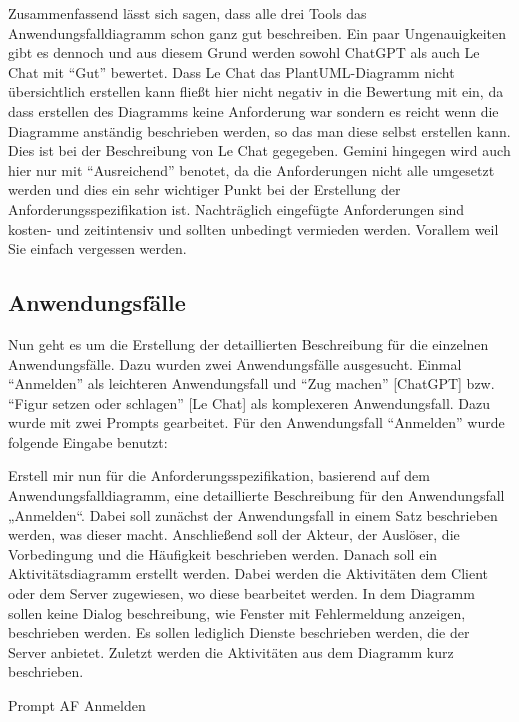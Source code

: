 Zusammenfassend lässt sich sagen, dass alle drei Tools das Anwendungsfalldiagramm schon ganz gut beschreiben. Ein paar Ungenauigkeiten gibt es dennoch und aus 
diesem Grund werden sowohl ChatGPT als auch Le Chat mit ``Gut'' bewertet. Dass Le Chat das PlantUML-Diagramm nicht übersichtlich erstellen kann fließt hier nicht
negativ in die Bewertung mit ein, da dass erstellen des Diagramms keine Anforderung war sondern es reicht wenn die Diagramme anständig beschrieben werden, so das man 
diese selbst erstellen kann. Dies ist bei der Beschreibung von Le Chat gegegeben. Gemini hingegen wird auch hier nur mit ``Ausreichend'' benotet, da die Anforderungen 
nicht alle umgesetzt werden und dies ein sehr wichtiger Punkt bei der Erstellung der Anforderungsspezifikation ist. Nachträglich eingefügte Anforderungen sind kosten- 
und zeitintensiv und sollten unbedingt vermieden werden. Vorallem weil Sie einfach vergessen werden. 

\subsection*{Anwendungsfälle}

Nun geht es um die Erstellung der detaillierten Beschreibung für die einzelnen Anwendungsfälle. Dazu wurden zwei Anwendungsfälle ausgesucht.
Einmal ``Anmelden'' als leichteren Anwendungsfall und ``Zug machen'' [ChatGPT] bzw. ``Figur setzen oder schlagen'' [Le Chat] 
als komplexeren Anwendungsfall. Dazu wurde mit zwei Prompts gearbeitet. Für den Anwendungsfall ``Anmelden'' wurde folgende Eingabe benutzt:

\begin{prompt}[H]
    \begin{tcolorbox}[colback=gray!20, colframe=gray!20, boxrule=0pt, sharp corners] 
        Erstell mir nun für die Anforderungsspezifikation, basierend auf dem Anwendungsfalldiagramm, eine detaillierte Beschreibung für den Anwendungsfall „Anmelden“. Dabei 
        soll zunächst der Anwendungsfall in einem Satz beschrieben werden, was dieser macht. Anschließend soll der Akteur, der Auslöser, die Vorbedingung und die Häufigkeit 
        beschrieben werden. Danach soll ein Aktivitätsdiagramm erstellt werden. Dabei werden die Aktivitäten dem Client oder dem Server zugewiesen, wo diese bearbeitet werden. 
        In dem Diagramm sollen keine Dialog beschreibung, wie Fenster mit Fehlermeldung anzeigen, beschrieben werden. Es sollen lediglich Dienste beschrieben werden, die der 
        Server anbietet. Zuletzt werden die Aktivitäten aus dem Diagramm kurz beschrieben.
        \vfill
    \end{tcolorbox}
    \caption{Prompt AF Anmelden}
    \label{Prompt AF Anmelden}
\end{prompt}


